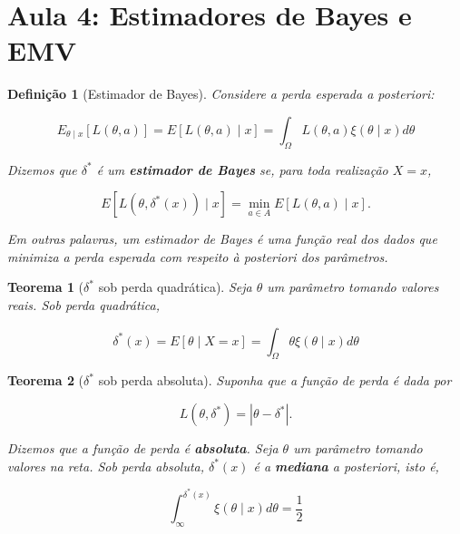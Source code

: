 \documentclass{article}
\newtheorem{theorem}{Teorema}
\newtheorem{definition}{Definição}
\begin{document}
\section*{Aula 4: Estimadores de Bayes e EMV}
\label{s4}
\begin{definition}[Estimador de Bayes]
Considere a perda esperada a posteriori:

\begin{equation}
E_{\theta \mid x} [L(\theta, a)] = E[L(\theta, a) \mid x] = \int_\Omega L(\theta, a) \xi (\theta \mid x) d \theta
\end{equation}

Dizemos que $\delta^*$ é um \textbf{estimador de Bayes} se, para toda realização $X = x$,

\begin{equation}
E[L(\theta, \delta^*(x)) \mid x] = \min_{a \in A} E[L(\theta, a) \mid x].
\end{equation}

Em outras palavras, um estimador de Bayes é uma função real dos dados que minimiza a perda esperada com respeito à posteriori dos parâmetros.
\end{definition}

\begin{theorem}[$\delta^*$ sob perda quadrática]
Seja $\theta$ um parâmetro tomando valores reais. Sob perda quadrática,

\begin{equation}
\delta^*(x) = E[\theta \mid X = x] = \int_\Omega \theta \xi(\theta \mid x) d \theta
\end{equation}
\end{theorem}

\begin{theorem}[$\delta^*$ sob perda absoluta]
Suponha que a função de perda é dada por

\begin{equation}
    L(\theta, \delta^*) = | \theta - \delta^*|.
\end{equation}

Dizemos que a função de perda é \textbf{absoluta}.
Seja $\theta$ um parâmetro tomando valores na reta. Sob perda absoluta, $\delta^*(x)$ é a \textbf{mediana} a posteriori, isto é,

\begin{equation}
    \int_{\infty}^{\delta^*(x)} \xi(\theta \mid x) d \theta = \frac{1}{2}
\end{equation}
\end{theorem}
\end{document}
